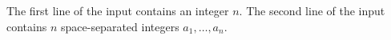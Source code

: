 The first line of the input contains an integer $n$.
The second line of the input contains $n$ space-separated integers $a_1,\ldots,a_n$.